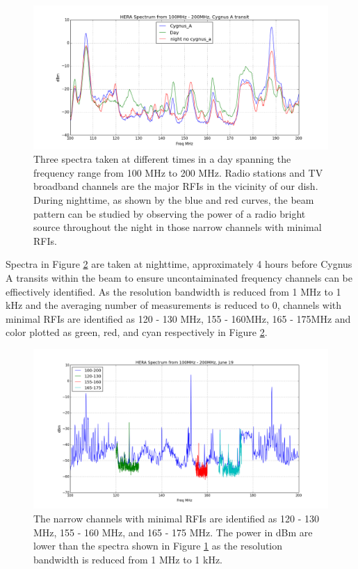 \documentclass[preprint]{aastex}  %
\begin{document}
\begin{figure}[H]
	\begin{center}
	\includegraphics[width =.8\textwidth]{spectra_plots/transit,day,night_match-yaxis.png}
	\caption{Three spectra taken at different times in a day spanning the frequency range from 100 MHz to 200 MHz. Radio stations and TV broadband channels are the major RFIs in the vicinity of our dish. During nighttime, as shown by the blue and red curves, the beam pattern can be studied by observing the power of a radio bright source throughout the night in those narrow channels with minimal RFIs.
\label{Fig:RFI}}
	\end{center}
\end{figure}
\clearpage

Spectra in Figure \ref{Fig:narrowchannels} are taken at nighttime, approximately 4 hours before Cygnus A transits within the beam to ensure uncontaiminated frequency channels can be effiectively identified. As the resolution bandwidth is reduced from 1 MHz to 1 kHz and the averaging number of measurements is reduced to 0, channels with minimal RFIs are identified as 120 - 130 MHz, 155 - 160MHz, 165 - 175MHz and color plotted as green, red, and cyan respectively in Figure \ref{Fig:narrowchannels}.
\begin{figure}[H]
	\begin{center}
	\includegraphics[width =.8\textwidth]{spectra_plots/all_channels}
	\caption{The narrow channels with minimal RFIs are identified as 120 - 130 MHz, 155 - 160 MHz, and 165 - 175 MHz. The power in dBm are lower than the spectra shown in Figure \ref{Fig:RFI} as the resolution bandwidth is reduced from 1 MHz to 1 kHz.
\label{Fig:narrowchannels} }
	\end{center}
\end{figure}
\clearpage
\end{document}
